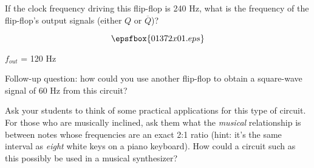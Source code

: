 

If the clock frequency driving this flip-flop is 240 Hz, what is the frequency of the flip-flop's output signals (either $Q$ or $\overline{Q}$)?

$$\epsfbox{01372x01.eps}$$







$f_{out}$ = 120 Hz

\vskip 10pt

Follow-up question: how could you use another flip-flop to obtain a square-wave signal of 60 Hz from this circuit?







Ask your students to think of some practical applications for this type of circuit.  For those who are musically inclined, ask them what the {\it musical} relationship is between notes whose frequencies are an exact 2:1 ratio (hint: it's the same interval as {\it eight} white keys on a piano keyboard).  How could a circuit such as this possibly be used in a musical synthesizer?




